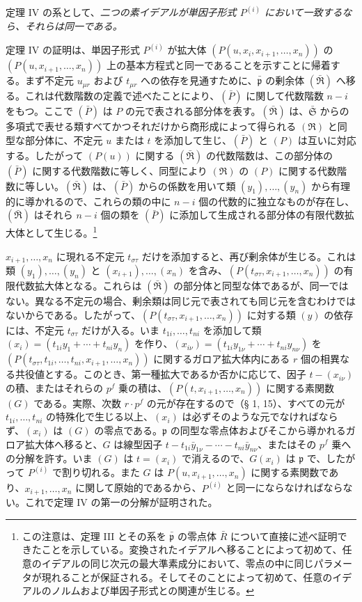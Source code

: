 \documentclass[11pt]{article}
\providecommand{\mR}{\mathfrak{R}}
\providecommand{\frakS}{\mathfrak S}
\providecommand{\frakp}{\mathfrak p}
\providecommand{\mR}{\mathfrak{R}}
\providecommand{\frakp}{\mathfrak p}
\begin{document}
定理 IV の系として、\emph{二つの素イデアルが単因子形式 $P^{(i)}$ において一致するなら、それらは同一である。}

定理 IV の証明は、単因子形式 $P^{(i)}$ が拡大体 $(P(u,x_i,x_{i+1},\ldots,x_n))$ の $(P(u,x_{i+1},\ldots,x_n))$ 上の基本方程式と同一であることを示すことに帰着する。まず不定元 $u_{\mu r}$ および $t_{\mu r}$ への依存を見通すために、$\bar{\frakp}$ の\mbox{剰余体} $(\bar{\mR})$ へ移る。これは代数階数の定義で述べたことにより、$(\bar P)$ に関して代数階数 $n-i$ をもつ。ここで $(\bar P)$ は $P$ の元で表される部分体を表す。$(\bar{\mR})$ は、$\bar{\frakS}$ からの多項式で表せる類すべてかつそれだけから商形成によって得られる $(\mR)$ と同型な部分体に、不定元 $u$ または $t$ を添加して生じ、$(\bar P)$ と $(P)$ は\mbox{互いに対応する}。したがって $(P(u))$ に関する $(\bar{\mR})$ の代数階数は、この部分体の $(\bar P)$ に関する代数階数に等しく、同型により $(\mR)$ の $(P)$ に関する代数階数に等しい。$(\bar{\mR})$ は、$(\bar P)$ からの係数を用いて類 $(y_1),\ldots,(y_n)$ から有理的に導かれるので、これらの類の中に $n-i$ 個の代数的に独立なものが存在し、$(\bar{\mR})$ はそれら $n-i$ 個の類を $(\bar P)$ に添加して生成される部分体の有限代数拡大体として生じる。\footnote{この注意は、定理 III とその系を $\bar{\frakp}$ の零点体 $\bar R$ について直接に述べ証明できたことを示している。変換されたイデアルへ移ることによって初めて、任意のイデアルの同じ次元の最大準素成分において、零点の中に同じパラメータが現れることが保証される。そしてそのことによって初めて、任意のイデアルのノルムおよび単因子形式との関連が生じる。}

$x_{i+1},\ldots,x_n$ に現れる不定元 $t_{\sigma\tau}$ だけを添加すると、再び剰余体が生じる。これは類 $(y_1),\ldots,(y_n)$ と $(x_{i+1}),\ldots,(x_n)$ を含み、$(P(t_{\sigma\tau},x_{i+1},\ldots,x_n))$ の有限代数拡大体となる。これらは $(\bar{\mR})$ の部分体と同型な体であるが、同一ではない。異なる不定元の場合、剰余類は同じ元で表されても同じ元を含むわけではないからである。したがって、$(P(t_{\sigma\tau},x_{i+1},\ldots,x_n))$ に対する類 $(y)$ の依存には、不定元 $t_{\sigma\tau}$ だけが入る。いま $t_{1i},\ldots,t_{ni}$ を添加して類 $(x_i)=(t_{1i}y_1+\cdots+t_{ni}y_n)$ を作り、$(x_{i\nu})=(t_{1i}y_{1\nu}+\cdots+t_{ni}y_{n\nu})$ を $(P(t_{\sigma\tau},t_{1i},\ldots,t_{ni},x_{i+1},\ldots,x_n))$ に関するガロア拡大体内にある $r$ 個の相異なる共役値とする。このとき、第一種拡大であるか否かに応じて、因子 $t-(x_{i\nu})$ の積、またはそれらの $p^f$ 乗の積は、$(P(t,x_{i+1},\ldots,x_n))$ に関する素関数 $(G)$ である。実際、次数 $r\cdot p^f$ の元が存在するので（§ 1, 15）、すべての元が $t_{1i},\ldots,t_{ni}$ の特殊化で生じる以上、$(x_i)$ は必ずそのような元でなければならず、$(x_i)$ は $(G)$ の零点である。$\frakp$ の同型な零点体およびそこから導かれるガロア拡大体へ移ると、$G$ は線型因子 $t-t_{1i}\bar y_{1\nu}-\cdots-t_{ni}\bar y_{n\nu}$、またはその $p^f$ 乗への分解を許す。いま $(G)$ は $t=(x_i)$ で消えるので、$G(x_i)$ は $\frakp$ で、したがって $P^{(i)}$ で割り切れる。また $G$ は $P(u,x_{i+1},\ldots,x_n)$ に関する素関数であり、$x_{i+1},\ldots,x_n$ に関して原始的であるから、$P^{(i)}$ と同一にならなければならない。これで定理 IV の第一の分解が証明された。
\end{document}
